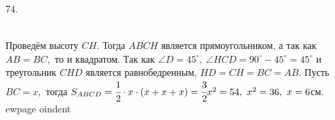 74. \begin{figure}[ht!]
\end{figure}\\
Проведём высоту $CH.$ Тогда $ABCH$ является прямоугольником, а так как $AB=BC,$ то и квадратом. Так как $\angle D=45^\circ,\ \angle HCD=90^\circ-45^\circ=45^\circ$ и треугольник $CHD$ является равнобедренным, $HD=CH=BC=AB.$ Пусть $BC=x,$ тогда $S_{ABCD}=\cfrac{1}{2}\cdot{x}\cdot(x+x+x)=\cfrac{3}{2}x^2=54,\ x^2=36,\ x=6$см.
ewpage
oindent
